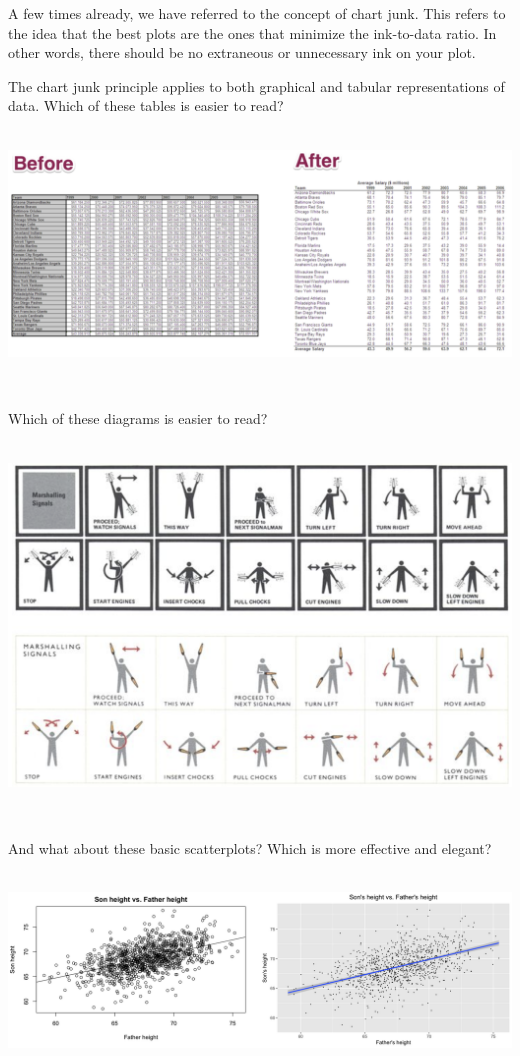\documentclass[
]{book}
\begin{document}
A few times already, we have referred to the concept of chart junk. This refers to the idea that the best plots are the ones that minimize the ink-to-data ratio. In other words, there should be no extraneous or unnecessary ink on your plot.

The chart junk principle applies to both graphical and tabular representations of data. Which of these tables is easier to read?

~\\

\includegraphics{img/vis17.png}

~

Which of these diagrams is easier to read?

~\\

\includegraphics{img/vis19.png}

~

And what about these basic scatterplots? Which is more effective and elegant?

~\\

\includegraphics{img/vish.png}
\end{document}
